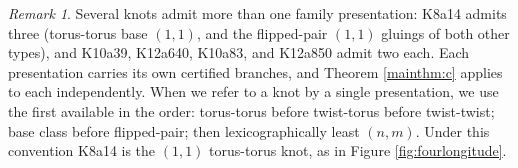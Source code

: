 \documentclass{article}
\theoremstyle{plain}
\theoremstyle{definition}
\theoremstyle{plain}
\theoremstyle{plain}
\theoremstyle{plain}
\theoremstyle{remark}
\newtheorem{remark}[theorem]{Remark}
\theoremstyle{remark}
\theoremstyle{plain}
\theoremstyle{plain}
\newcounter{main}
\theoremstyle{plain}
\theoremstyle{plain}
\begin{document}
\begin{remark}\label{rmk:priority}
Several knots admit more than one family presentation: K8a14 admits three (torus-torus base $(1,1)$, and the flipped-pair $(1,1)$ gluings of both other types), and K10a39, K12a640, K10a83, and K12a850 admit two each. Each presentation carries its own certified branches, and Theorem \ref{mainthm:c} applies to each independently. When we refer to a knot by a single presentation, we use the first available in the order: torus-torus before twist-torus before twist-twist; base class before flipped-pair; then lexicographically least $(n, m)$. Under this convention K8a14 is the $(1,1)$ torus-torus knot, as in Figure \ref{fig:fourlongitude}.
\end{remark} 

\end{document}
